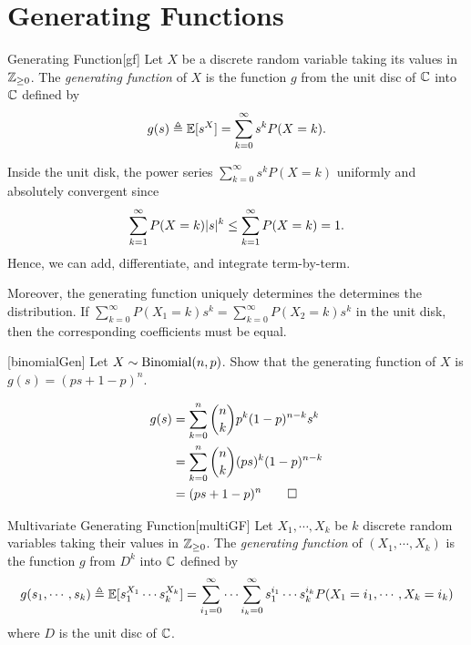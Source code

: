 \documentclass[../probability.tex]{subfiles}
\begin{document}
\section{Generating Functions}

\begin{Definition}{Generating Function}[gf]
    Let \(X\) be a discrete random variable taking its values in \(\ZZ_{\ge 0}\).
    The \emph{generating function} of \(X\) is the function \(g\)
    from the unit disc of \(\CC\) into \(\CC\) defined by
    \[
        g(s) \triangleq \mathbb{E}[s^X]
        = \sum_{k=0}^\infty s^k P(X=k)\text.
    \]
\end{Definition}

\begin{note}
    Inside the unit disk, the power series \(\sum_{k=0}^\infty s^k P(X=k)\)
    uniformly and absolutely convergent since
    \[
        \sum_{k=1}^\infty P(X=k) |s|^k
        \le \sum_{k=1}^\infty P(X=k) = 1\text.
    \]
    Hence, we can add, differentiate, and integrate term-by-term.

    Moreover, the generating function uniquely determines the determines the distribution.
    If \(\sum_{k=0}^\infty P(X_1=k) s^k = \sum_{k=0}^\infty P(X_2=k) s^k\)
    in the unit disk, then the corresponding coefficients must be equal.
\end{note}

\begin{Exercise}{}[binomialGen]
    Let \(X \sim \operatorname{Binomial}(n, p)\).
    Show that the generating function of \(X\)
    is \(g(s) = (ps + 1 - p)^n\).
\end{Exercise}
\begin{solution}
    \begin{align*}
        g(s)
        &= \sum_{k=0}^n \binom{n}{k} p^k (1-p)^{n-k} s^k \\
        &= \sum_{k=0}^n \binom{n}{k} (ps)^k (1-p)^{n-k} \\
        &= (ps + 1 - p)^n \qedhere
    \end{align*}
\end{solution}

\begin{Definition}{Multivariate Generating Function}[multiGF]
    Let \(X_1, \cdots, X_k\) be \(k\) discrete random variables taking their values in \(\ZZ_{\ge 0}\).
    The \emph{generating function} of \((X_1, \cdots, X_k)\) is the function \(g\)
    from \(D^k\) into \(\CC\) defined by
    \[
        g(s_1, \cdots, s_k) \triangleq \mathbb{E}[s_1^{X_1} \cdots s_k^{X_k}]
        = \sum_{i_1=0}^\infty \cdots \sum_{i_k=0}^\infty s_1^{i_1} \cdots s_k^{i_k} P(X_1=i_1,
        \cdots, X_k=i_k)
    \]
    where \(D\) is the unit disc of \(\CC\).
\end{Definition}
\end{document}
